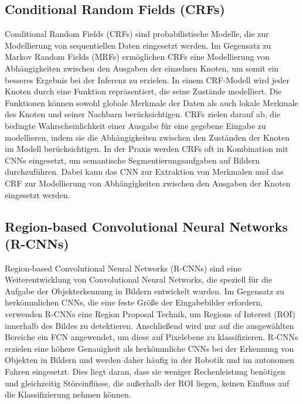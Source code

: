 \subsection{Conditional Random Fields (CRFs)}
Conditional Random Fields (CRFs) sind probabilistische Modelle, die zur
Modellierung von sequentiellen Daten eingesetzt werden. Im Gegensatz zu Markov
Random Fields (MRFs) ermöglichen CRFs eine Modellierung von Abhängigkeiten
zwischen den Ausgaben der einzelnen Knoten, um somit ein besseres Ergebnis bei
der Inferenz zu erzielen. In einem CRF-Modell wird jeder Knoten durch eine
Funktion repräsentiert, die seine Zustände modelliert. Die Funktionen können
sowohl globale Merkmale der Daten als auch lokale Merkmale des Knoten und
seiner Nachbarn berücksichtigen. CRFs zielen darauf ab, die bedingte
Wahrscheinlichkeit einer Ausgabe für eine gegebene Eingabe zu modellieren,
indem sie die Abhängigkeiten zwischen den Zuständen der Knoten im Modell
berücksichtigen. In der Praxis werden CRFs oft in Kombination mit CNNs
eingesetzt, um semantische Segmentierungsaufgaben auf Bildern durchzuführen.
Dabei kann das CNN zur Extraktion von Merkmalen und das CRF zur Modellierung
von Abhängigkeiten zwischen den Ausgaben der Knoten eingesetzt werden.

\subsection{Region-based Convolutional Neural Networks (R-CNNs)}
Region-based Convolutional Neural Networks (R-CNNs) sind eine Weiterentwicklung
von Convolutional Neural Networks, die speziell für die Aufgabe der
Objekterkennung in Bildern entwickelt wurden. Im Gegensatz zu herkömmlichen
CNNs, die eine feste Größe der Eingabebilder erfordern, verwenden R-CNNs eine
Region Proposal Technik, um Regions of Interest (ROI) innerhalb des Bildes zu
detektieren. Anschließend wird nur auf die ausgewählten Bereiche ein FCN
angewendet, um diese auf Pixelebene zu klassifizieren. R-CNNs erzielen eine
höhere Genauigkeit als herkömmliche CNNs bei der Erkennung von Objekten in
Bildern und werden daher häufig in der Robotik und im autonomen Fahren
eingesetzt. Dies liegt daran, dass sie weniger Rechenleistung benötigen und
gleichzeitig Störeinflüsse, die außerhalb der ROI liegen, keinen Einfluss auf
die Klassifizierung nehmen können. \cite{8237584}

